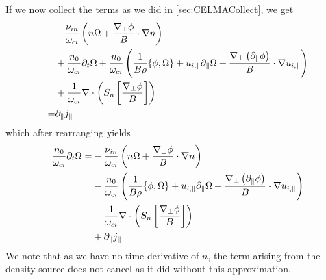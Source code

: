 %
If we now collect the terms as we did in \cref{sec:CELMACollect}, we get
%
\begin{align*}
  &
  \quad
 \frac{\nu_{in}}{\omega_{ci}} \left(n\Omega + \frac{\nabla_\perp \phi}{B} \cdot \nabla n\right)
  \\
 &
 + \frac{n_0}{\omega_{ci}}\partial_t\Omega
 + \frac{n_0}{\omega_{ci}}
 \left(
 \frac{1}{B\rho}\{\phi, \Omega\}
 + u_{i,\|}\partial_\|\Omega
 + \frac{\nabla_\perp\left( \partial_\|\phi\right)}{B}\cdot\nabla u_{i,\|}
 \right)
 \\
 &
 + \frac{1}{\omega_{ci}}
    \nabla\cdot \left( S_n \left[ \frac{ \nabla_\perp \phi }{ B } \right] \right)
 \\
 =&
 \partial_\| j_\|
\end{align*}
%
which after rearranging yields
%
\begin{align*}
 \frac{n_0}{\omega_{ci}}\partial_t\Omega
 =&
 - \frac{\nu_{in}}{\omega_{ci}} \left(n\Omega + \frac{\nabla_\perp \phi}{B} \cdot \nabla n\right)
  \\
 &- \frac{n_0}{\omega_{ci}}
 \left( \frac{1}{B\rho}\{\phi, \Omega\}
    + u_{i,\|}\partial_\|\Omega
    + \frac{\nabla_\perp\left( \partial_\|\phi\right)}{B}\cdot\nabla u_{i,\|}
 \right)
 \\
 &
 - \frac{1}{\omega_{ci}}
    \nabla\cdot \left( S_n \left[ \frac{ \nabla_\perp \phi }{ B } \right] \right)
 \\
 &
 + \partial_\| j_\|
\end{align*}
%
We note that as we have no time derivative of $n$, the term arising from the density source does not cancel as it did without this approximation.
%

